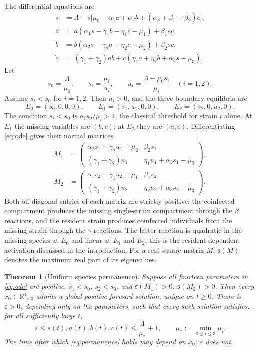 \documentclass[11pt,a4paper]{article}
\theoremstyle{plain}
\newtheorem{theorem}{Theorem}[section]
\theoremstyle{definition}
\theoremstyle{remark}
\newcommand{\R}{\mathbb R}
\newcommand{\spb}{\mathfrak s}
\newcommand{\eps}{\varepsilon}
\newcommand{\mat}[4]{\begin{pmatrix}#1&#2\\#3&#4\end{pmatrix}}
\begin{document}
The differential equations are
\begin{equation}\label{eq:ode}
\begin{aligned}
 \dot s&=\Lambda-s\bigl[\mu_0+\alpha_1a+\alpha_2b+(\alpha_3+\beta_1+\beta_2)c\bigr],\\
 \dot a&=a(\alpha_1s-\gamma_1b-\eta_1c-\mu_1)+\beta_1sc,\\
 \dot b&=b(\alpha_2s-\gamma_2a-\eta_2c-\mu_2)+\beta_2sc,\\
 \dot c&=(\gamma_1+\gamma_2)ab+c(\eta_1a+\eta_2b+\alpha_3s-\mu_3).
\end{aligned}
\end{equation}
Let
\begin{equation}\label{eq:residents}
 s_0=\frac{\Lambda}{\mu_0},\qquad s_i=\frac{\mu_i}{\alpha_i},\qquad
 u_i=\frac{\Lambda-\mu_0s_i}{\mu_i}\quad(i=1,2).
\end{equation}
Assume $s_i<s_0$ for $i=1,2$. Then $u_i>0$, and the three boundary equilibria are
\[
 E_0=(s_0,0,0,0),\qquad E_1=(s_1,u_1,0,0),\qquad E_2=(s_2,0,u_2,0).
\]
The condition $s_i<s_0$ is $\alpha_is_0/\mu_i>1$, the classical threshold for strain $i$ alone. At $E_1$ the missing variables are $(b,c)$; at $E_2$ they are $(a,c)$. Differentiating \eqref{eq:ode} gives their normal matrices
\begin{equation}\label{eq:blocks}
\begin{split}
 M_1&=\mat{\alpha_2s_1-\gamma_2u_1-\mu_2}{\beta_2s_1}
                  {(\gamma_1+\gamma_2)u_1}{\eta_1u_1+\alpha_3s_1-\mu_3},\\[3pt]
 M_2&=\mat{\alpha_1s_2-\gamma_1u_2-\mu_1}{\beta_1s_2}
                  {(\gamma_1+\gamma_2)u_2}{\eta_2u_2+\alpha_3s_2-\mu_3}.
\end{split}
\end{equation}
Both off-diagonal entries of each matrix are strictly positive: the coinfected compartment produces the missing single-strain compartment through the $\beta$ reactions, and the resident strain produces coinfected individuals from the missing strain through the $\gamma$ reactions. The latter reaction is quadratic in the missing species at $E_0$ and linear at $E_1$ and $E_2$; this is the resident-dependent activation discussed in the introduction. For a real square matrix $M$, $\spb(M)$ denotes the maximum real part of its eigenvalues.

\begin{theorem}[Uniform species permanence]\label{thm:main}
Suppose all fourteen parameters in \eqref{eq:ode} are positive, $s_1<s_0$, $s_2<s_0$, and $\spb(M_1)>0$, $\spb(M_2)>0$. Then every $x_0\in\R_{>0}^4$ admits a global positive forward solution, unique on $t\ge0$. There is $\eps>0$, depending only on the parameters, such that every such solution satisfies, for all sufficiently large $t$,
\begin{equation}\label{eq:permanence}
 \eps\le s(t),a(t),b(t),c(t)\le\frac{\Lambda}{\mu_*}+1,
 \qquad \mu_*:=\min_{0\le i\le3}\mu_i.
\end{equation}
The time after which \eqref{eq:permanence} holds may depend on $x_0$; $\eps$ does not.
\end{theorem}
\end{document}
